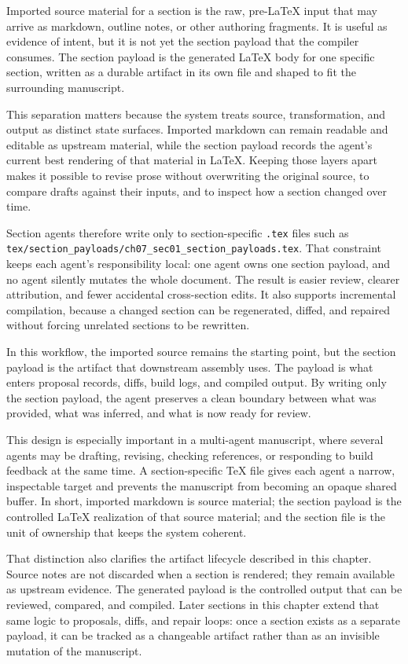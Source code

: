 Imported source material for a section is the raw, pre-\LaTeX{} input that may arrive as markdown, outline notes, or other authoring fragments. It is useful as evidence of intent, but it is not yet the section payload that the compiler consumes. The section payload is the generated \LaTeX{} body for one specific section, written as a durable artifact in its own file and shaped to fit the surrounding manuscript.

This separation matters because the system treats source, transformation, and output as distinct state surfaces. Imported markdown can remain readable and editable as upstream material, while the section payload records the agent's current best rendering of that material in \LaTeX{}. Keeping those layers apart makes it possible to revise prose without overwriting the original source, to compare drafts against their inputs, and to inspect how a section changed over time.

Section agents therefore write only to section-specific \texttt{.tex} files such as \texttt{tex/section\_payloads/ch07\_sec01\_section\_payloads.tex}. That constraint keeps each agent's responsibility local: one agent owns one section payload, and no agent silently mutates the whole document. The result is easier review, clearer attribution, and fewer accidental cross-section edits. It also supports incremental compilation, because a changed section can be regenerated, diffed, and repaired without forcing unrelated sections to be rewritten.

In this workflow, the imported source remains the starting point, but the section payload is the artifact that downstream assembly uses. The payload is what enters proposal records, diffs, build logs, and compiled output. By writing only the section payload, the agent preserves a clean boundary between what was provided, what was inferred, and what is now ready for review.

This design is especially important in a multi-agent manuscript, where several agents may be drafting, revising, checking references, or responding to build feedback at the same time. A section-specific TeX file gives each agent a narrow, inspectable target and prevents the manuscript from becoming an opaque shared buffer. In short, imported markdown is source material; the section payload is the controlled \LaTeX{} realization of that source material; and the section file is the unit of ownership that keeps the system coherent.

That distinction also clarifies the artifact lifecycle described in this chapter. Source notes are not discarded when a section is rendered; they remain available as upstream evidence. The generated payload is the controlled output that can be reviewed, compared, and compiled. Later sections in this chapter extend that same logic to proposals, diffs, and repair loops: once a section exists as a separate payload, it can be tracked as a changeable artifact rather than as an invisible mutation of the manuscript.

